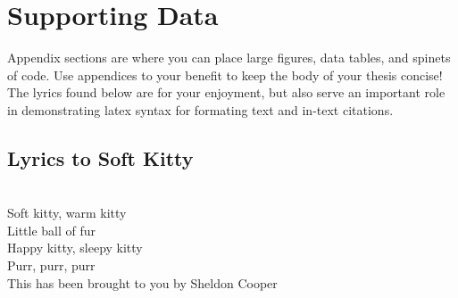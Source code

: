 \chapter{Supporting Data}

Appendix sections are where you can place large figures, data tables, and spinets of code. Use appendices to your benefit to keep the body of your thesis concise!\\

The lyrics found below are for your enjoyment, but also serve an important role in demonstrating latex syntax for formating text and in-text citations.  

\section{Lyrics to Soft Kitty}

\begin{center}
\mbox{}\\[0.2in]
Soft kitty, warm kitty\\
Little ball of fur\\
Happy kitty, sleepy kitty\\
Purr, purr, purr\\[0.5in]


This has been brought to you by Sheldon Cooper \cite{BigBang}
\end{center}

\clearpage